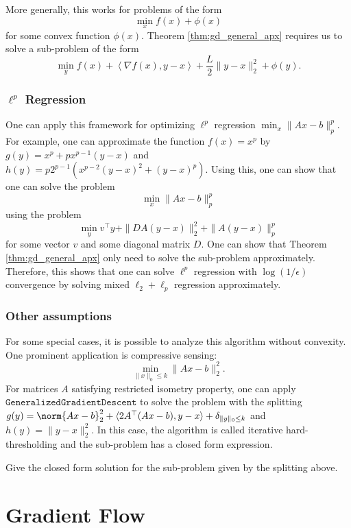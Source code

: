 More generally, this works for problems of the form
\[
\min_{x}f(x)+\phi(x)
\]
for some convex function $\phi(x)$. Theorem \ref{thm:gd_general_apx}
requires us to solve a sub-problem of the form
\[
\min_{y}f(x)+\left\langle \nabla f(x),y-x\right\rangle +\frac{L}{2}\|y-x\|_{2}^{2}+\phi(y).
\]


\subsubsection*{$\ell^{p}$ Regression}

One can apply this framework for optimizing $\ell^{p}$ regression
$\min_{x}\|Ax-b\|_{p}^{p}$. For example, one can approximate the
function $f(x)=x^{p}$ by $g(y)=x^{p}+px^{p-1}(y-x)$ and $h(y)=p2^{p-1}(x^{p-2}(y-x)^{2}+(y-x)^{p})$.
Using this, one can show that one can solve the problem
\[
\min_{x}\|Ax-b\|_{p}^{p}
\]
using the problem
\begin{equation}
\min_{y}v^{\top}y+\|DA(y-x)\|_{2}^{2}+\|A(y-x)\|_{p}^{p}\label{eq:l2lp}
\end{equation}
for some vector $v$ and some diagonal matrix $D$. One can show that
Theorem \ref{thm:gd_general_apx} only need to solve the sub-problem
approximately. Therefore, this shows that one can solve $\ell^{p}$
regression with $\log(1/\epsilon)$ convergence by solving mixed $\ell_{2}+\ell_{p}$
regression approximately. 

\subsubsection*{Other assumptions}

For some special cases, it is possible to analyze this algorithm without
convexity. One prominent application is compressive sensing: 
\[
\min_{\|x\|_{0}\leq k}\|Ax-b\|_{2}^{2}.
\]
For matrices $A$ satisfying restricted isometry property, one can
apply $\mathtt{GeneralizedGradientDescent}$ to solve the problem
with the splitting $g(y)=\norm{Ax-b}_{2}^{2}+\langle2A^{\top}(Ax-b),y-x\rangle+\delta_{\|y\|_{0}\leq k}$
and $h(y)=\|y-x\|_{2}^{2}$. In this case, the algorithm is called
iterative hard-thresholding \cite{blumensath2009iterative} and the
sub-problem has a closed form expression.
\begin{xca}
Give the closed form solution for the sub-problem given by the splitting
above.
\end{xca}


\section{Gradient Flow}


